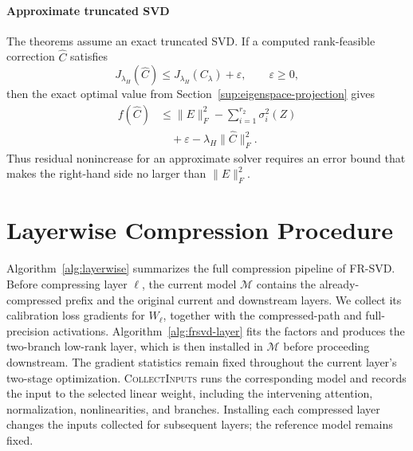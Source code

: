 \paragraph{Approximate truncated SVD}
The theorems assume an exact truncated SVD. If a computed rank-feasible correction $\widehat C$ satisfies
\begin{equation}
J_{\lambda_H}(\widehat C)
\le J_{\lambda_H}(C_\lambda)+\varepsilon,
\qquad\varepsilon\ge0,
\end{equation}
then the exact optimal value from Section~\ref{sup:eigenspace-projection} gives
\begin{equation}
\begin{aligned}
f(\widehat C)
&\le\|E\|_F^2-\sum_{i=1}^{r_2}\sigma_i^2(Z) \\
&\quad+\varepsilon-\lambda_H\|\widehat C\|_F^2.
\end{aligned}
\end{equation}
Thus residual nonincrease for an approximate solver requires an error bound that makes the right-hand side no larger than $\|E\|_F^2$.

\section{Layerwise Compression Procedure}\label{app:algorithms}

Algorithm~\ref{alg:layerwise} summarizes the full compression pipeline of FR-SVD. Before compressing layer $\ell$, the current model $\mathcal M$ contains the already-compressed prefix and the original current and downstream layers. We collect its calibration loss gradients for $W_\ell$, together with the compressed-path and full-precision activations. Algorithm~\ref{alg:frsvd-layer} fits the factors and produces the two-branch low-rank layer, which is then installed in $\mathcal M$ before proceeding downstream. The gradient statistics remain fixed throughout the current layer's two-stage optimization. \textsc{CollectInputs} runs the corresponding model and records the input to the selected linear weight, including the intervening attention, normalization, nonlinearities, and branches. Installing each compressed layer changes the inputs collected for subsequent layers; the reference model remains fixed.

